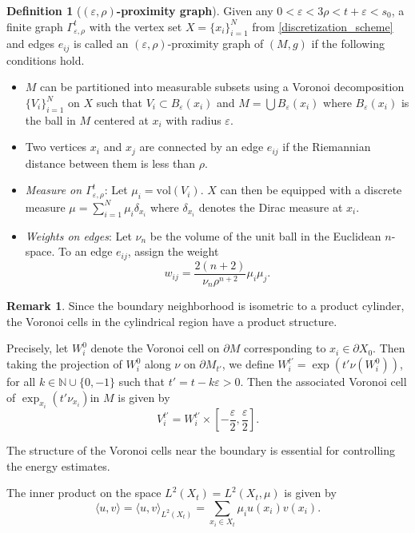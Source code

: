 \documentclass[10 pt, reqno]{amsart}
\theoremstyle{definition}
\newtheorem{definition}{Definition}
\newtheorem{remark}[theorem]{Remark}
\numberwithin{equation}{section}
\begin{document}
\begin{definition}[\bf{$(\varepsilon,\rho)$-proximity graph}] Given any $0<\varepsilon<3\rho<t+\varepsilon<s_0$, a finite graph $\Gamma^t_{\varepsilon,\rho}$ with the vertex set $ X=\{x_i\}_{i=1}^N$ from \ref{discretization_scheme} and edges ${e_{ij}}$ is called an $(\varepsilon,\rho)$-proximity graph of $(M,g)$ if the following conditions hold. 
\begin{itemize}
        \item $M$ can be partitioned into measurable subsets using a Voronoi decomposition $\{V_i\}_{i=1}^N$ on $X$ such that $V_i\subset B_{\varepsilon}(x_i)$ and $M=\bigcup B_{\varepsilon}(x_i)$ where $B_{\varepsilon}(x_{i})$ is the ball in $M$ centered at $x_{i}$ with radius $\varepsilon$. 
        \item Two vertices $x_i$ and $x_j$ are connected by an edge $e_{ij}$ if the Riemannian distance between them is less than $\rho.$
        \item {\it Measure on $\Gamma^t_{\varepsilon,\rho}$}:  Let $\mu_{i}=\text{vol}(V_{i}).$  $X$ can then be equipped with a discrete measure $\mu=\sum_{i=1}^{N}\mu_{i}\delta_{x_{i}}$ where $\delta_{x_i}$ denotes the Dirac measure at $x_i.$
         \item \textit{Weights on edges}: Let $\nu_{n}$ be the volume of the unit ball in the Euclidean $n$-space. To an edge $e_{ij}$, assign the weight 
    \begin{equation*}
        w_{ij}=\frac{2(n+2)}{\nu_{n}\rho^{n+2}}\mu_{i}\mu_{j}.
    \end{equation*}
        \end{itemize}
        \end{definition}
\begin{remark}
Since the boundary neighborhood is isometric to a product cylinder, the Voronoi cells in the cylindrical region have a product structure.

Precisely, let $W_i^0$ denote the Voronoi cell on  $\partial M$ corresponding to $x_i \in \partial X_0$. Then taking the projection of $W_i^0$ along $\nu$ on $\partial M_{t'}$, we define $W_i^{t'}=\exp(t'\nu(W_i^0))$, for all $k\in \mathbb{N}\cup\{0,-1\}$ such that $t'= t-k\varepsilon>0$. 
Then the associated Voronoi cell of $\exp_{x_i}(t'\nu_{x_i})$in $M$ is given by
\[
V_i^{t'} = W_i^{t'} \times \left[-\frac{\varepsilon}{2},\frac{\varepsilon}{2}\right].
\]

The structure of the Voronoi cells near the boundary is essential for controlling the energy estimates. 
\end{remark}
The inner product on the  space $L^2(X_t)=L^2(X_t,\mu)$ is given by
\[\langle u,v\rangle= \langle u,v\rangle_{L^2(X_t)}=\sum_{x_i\in X_t}\mu_i u(x_i)v(x_i).\]
\end{document}
